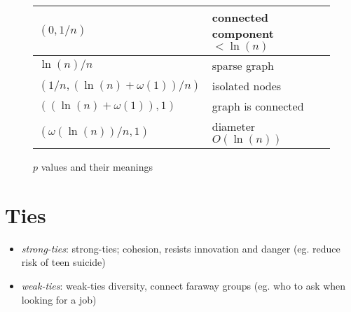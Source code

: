   \begin{figure}[H]
    \centering
    \caption{$ p $ values and their meanings}
    \begin{tabu} to \textwidth{| X[l, 1] | X[l, 1] |}
      \hline
      $ \left( 0, 1/n \right) $ & connected component $ < \ln\left( n \right) $ \\ \hline
      $ \ln\left( n \right) / n $ & sparse graph \\ \hline
      $ \left( 1/n, \left( \ln(n) + \omega(1) \right) / n \right) $ & isolated nodes \\ \hline
      $ \left( \left( \ln(n) + \omega(1) \right), 1 \right) $ & graph is connected \\ \hline
      $ \left( \omega\left( \ln(n) \right) / n, 1 \right) $ & diameter $ O\left( \ln(n) \right) $ \\ \hline
    \end{tabu}
  \end{figure}

\section{Ties}

  \begin{itemize}
    \item \emph{\Gls{strong-ties}}: \glsdesc{strong-ties};
    cohesion, resists innovation and danger (eg. reduce risk of teen suicide)
    \item \emph{\Gls{weak-ties}}: \glsdesc{weak-ties}
    diversity, connect faraway groups (eg. who to ask when looking for a job)
  \end{itemize}
